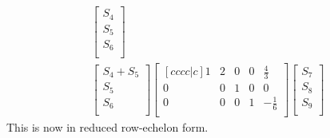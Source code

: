 \documentclass{report}
\theoremstyle{plain}
\theoremstyle{definition}
\theoremstyle{plain}
\begin{document}
\begin{align*}
\begin{bmatrix}
S_4\\ S_5\\ S_6\\
\end{bmatrix}\\
\begin{bmatrix}
S_4 + S_5\\
S_5\\
S_6\\
\end{bmatrix}
\begin{bmatrix}[cccc|c]
1 & 2 & 0 & 0 & \frac{4}{3}\\
0 & 0 & 1 & 0 & 0\\
0 & 0 & 0 & 1 & -\frac{1}{6}\\
\end{bmatrix}
\begin{bmatrix}
S_7\\
S_8\\
S_9\\
\end{bmatrix}
\end{align*}
This is now in reduced row-echelon form.\\
\\
\end{document}
